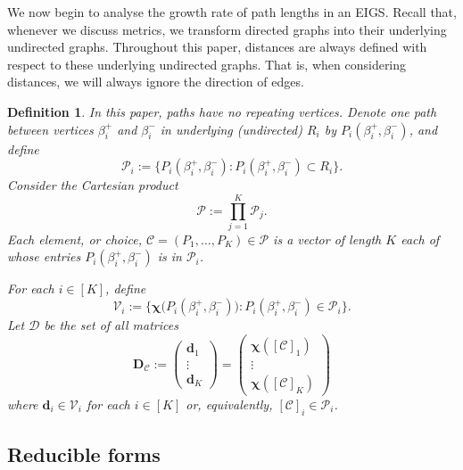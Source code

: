 \documentclass[12pt]{iopart}
\newtheorem{definition}[theorem]{Definition}
\newcommand*{\bbbchi}{\boldsymbol{\chi}}
\begin{document}
We now begin to analyse the growth rate of path lengths in an EIGS.
Recall that, whenever we discuss metrics, we transform directed graphs into their underlying undirected graphs.
Throughout this paper, distances are always defined with respect to these underlying undirected graphs.
That is, when considering distances, we will always ignore the direction of edges.

\begin{definition}\label{def:Path Matrix D}
In this paper, paths have no repeating vertices.
Denote one path between vertices $\beta_i^+$ and $\beta_i^-$ in underlying (undirected) $R_i$ by $P_i(\beta_i^+,\beta_i^-)$, and define
\[
  \mathcal{P}_i :=\big\{P_i(\beta_i^+,\beta_i^-) : P_i(\beta_i^+,\beta_i^-) \subset R_i \big\} .
\]
Consider the Cartesian product 
\[
  \mathcal{P} := \prod_{j=1}^{ K} \mathcal{P}_j .
\]
Each element, or {\em choice}, 
$\mathcal{C} = (P_1,\ldots,P_K)\in\mathcal{P}$ is a vector of length $K$ 
each of whose entries $P_i(\beta_i^+,\beta_i^-)$ is in $\mathcal{P}_i$.

For each $i \in [K]$, define
\[
  \mathcal{V}_i := \big\{ \bbbchi\big( P_i(\beta_i^+,\beta_i^-) \big) : P_i(\beta_i^+,\beta_i^-)\in\mathcal{P}_i\big\} .
\]
Let $\mathcal{D}$ be the set of all matrices 
\[
    \mathbf{D}_{\mathcal{C}}
  := \begin{pmatrix}\mathbf{d}_1\\
  \vdots\\
  \mathbf{d}_K\end{pmatrix}
  = \begin{pmatrix}\bbbchi([\mathcal{C}]_1)\\
  \vdots\\
  \bbbchi([\mathcal{C}]_K)\end{pmatrix} 
\]
where $\mathbf{d}_i\in \mathcal{V}_i$ for each $i \in [K]$ or, 
equivalently, $[\mathcal{C}]_i\in\mathcal{P}_i$. 
\end{definition}


\subsection{Reducible forms}
\end{document}
